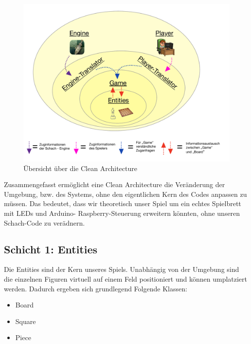 \documentclass[
10pt, %
a4paper, %
oneside, %
headinclude,footinclude, %
BCOR5mm, %
]{scrartcl}
\begin{document}
\begin{figure}[h]
	\begin{center}
		\includegraphics[width = \textwidth]{onion.pdf}
		\caption{Übersicht über die Clean Architecture}
		\label{fig:umlEntities}
	\end{center}
\end{figure}

Zusammengefasst ermöglicht eine Clean Architecture die Veränderung der Umgebung, bzw. des Systems, ohne den eigentlichen Kern des Codes anpassen zu müssen.
Das bedeutet, dass wir theoretisch unser Spiel um ein echtes Spielbrett mit LEDs und Arduino- Raspberry-Steuerung erweitern könnten, ohne unseren Schach-Code zu verädnern.
\newpage
\subsection{Schicht 1: Entities}
Die Entities sind der Kern unseres Spiels. Unabhängig von der Umgebung sind die einzelnen Figuren virtuell auf einem Feld positioniert und können umplatziert werden.
Dadurch ergeben sich grundlegend Folgende Klassen: 

\begin{center}
	\begin{itemize}
		\item Board
		\item Square
		\item Piece
	\end{itemize}
\end{center}
\end{document}
